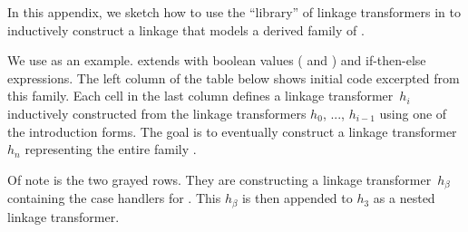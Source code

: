 In this appendix, we sketch how to use the ``library'' of linkage
transformers in \TT to inductively construct a linkage that models a
derived family of .

We use  as an example.  extends
 with boolean values ( and )
and if-then-else expressions.
The left column of the table below shows initial code excerpted from
this family.
Each cell in the last column defines a linkage transformer~$h_i$
inductively constructed from the linkage transformers $h_0$, ..., $h_{i-1}$
using one of the introduction forms.
The goal is to eventually construct a linkage transformer $h_n$ representing
the entire family .

Of note is the two grayed rows. They are constructing a linkage transformer~$h_\beta$
containing the case handlers for .
This $h_\beta$ is then appended to $h_3$ as a nested linkage transformer.

\medskip

